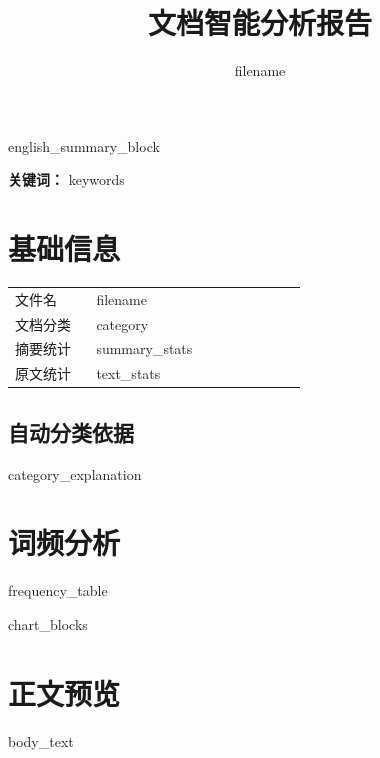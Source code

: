 \documentclass[UTF8,zihao=-4,a4paper]{ctexart}
\title{\sffamily\bfseries\zihao{2} 文档智能分析报告}
\author{{{ filename }}}
\date{}
\begin{document}
\maketitle
\thispagestyle{fancy}

\begin{abstract}
\end{abstract}

{{ english_summary_block }}

\noindent\textbf{关键词：} {{ keywords }}

\section{基础信息}
\begin{center}
\begin{tabular}{p{0.24\linewidth}p{0.62\linewidth}}
\toprule
文件名 & {{ filename }}\\
文档分类 & {{ category }}\\
摘要统计 & {{ summary_stats }}\\
原文统计 & {{ text_stats }}\\
\bottomrule
\end{tabular}
\end{center}

\subsection{自动分类依据}
{{ category_explanation }}

\section{词频分析}
{{ frequency_table }}

{{ chart_blocks }}

\section{正文预览}
{{ body_text }}
\end{document}

